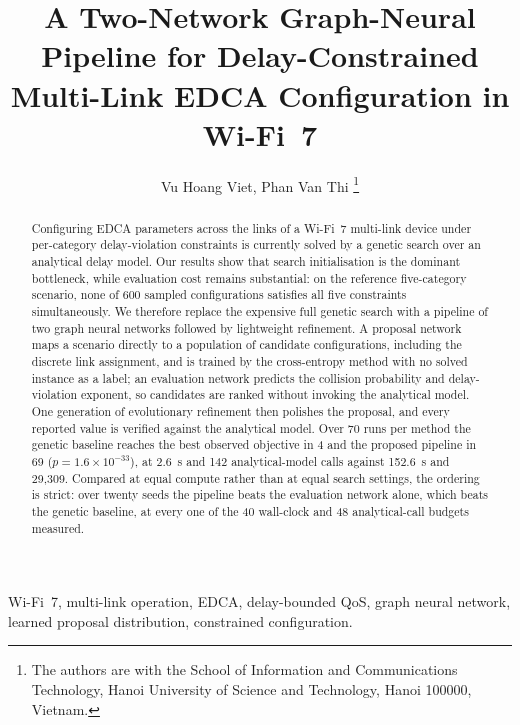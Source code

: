 \documentclass[journal,a4paper,comsoc,twocolumn]{IEEEtran}
\begin{document}
\raggedbottom

\title{A Two-Network Graph-Neural Pipeline for Delay-Constrained Multi-Link
EDCA Configuration in Wi-Fi~7}

\author{Vu Hoang Viet, Phan Van Thi%
\thanks{The authors are with the School of Information and Communications
Technology, Hanoi University of Science and Technology, Hanoi 100000, Vietnam.
}%
}

\maketitle

\begin{abstract}
Configuring EDCA parameters across the links of a Wi-Fi~7 multi-link device
under per-category delay-violation constraints is currently solved by a genetic
search over an analytical delay model. Our results show that search
initialisation is the dominant bottleneck, while evaluation cost remains
substantial: on the reference five-category scenario, none of 600 sampled
configurations satisfies all five constraints simultaneously. We therefore
replace the expensive full genetic search with a pipeline of two graph neural
networks followed by lightweight refinement. A proposal network maps a scenario
directly to a population of candidate configurations, including the discrete
link assignment, and is trained
by the cross-entropy method with no solved instance as a label; an evaluation
network predicts the collision probability and delay-violation exponent, so
candidates are ranked without invoking the analytical model. One generation of
evolutionary refinement then polishes the proposal, and every reported value is
verified against the analytical model. Over 70 runs per method the genetic
baseline reaches the best observed objective in 4 and the proposed pipeline in
69 ($p = 1.6 \times 10^{-33}$), at 2.6~s and 142 analytical-model calls against
152.6~s and 29{,}309. Compared at equal compute rather than at equal search
settings, the ordering is strict: over twenty seeds the pipeline beats the
evaluation network alone, which beats the genetic baseline, at every one of the
40 wall-clock and 48 analytical-call budgets measured.
\end{abstract}

\begin{IEEEkeywords}
Wi-Fi~7, multi-link operation, EDCA, delay-bounded QoS, graph neural network,
learned proposal distribution, constrained configuration.
\end{IEEEkeywords}
\end{document}
